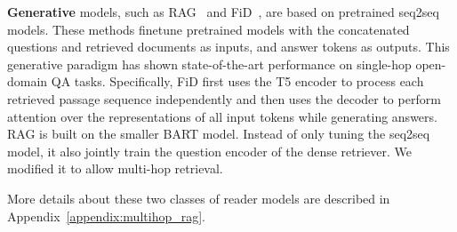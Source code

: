 \textbf{Generative} models, such as RAG~\citep{RAG} and FiD~\citep{FiD}, are based on pretrained seq2seq models. These methods finetune pretrained models with the concatenated questions and retrieved documents as inputs, and answer tokens as outputs. This generative paradigm has shown state-of-the-art performance on single-hop open-domain QA tasks. Specifically, FiD first uses the T5 encoder to process each retrieved passage sequence independently and then uses the decoder to perform attention over the representations of all input tokens while generating answers. RAG is built on the smaller BART model. Instead of only tuning the seq2seq model, it also jointly train the question encoder of the dense retriever. We modified it to allow multi-hop retrieval. 

More details about these two classes of reader models are described in Appendix~\ref{appendix:multihop_rag}.

